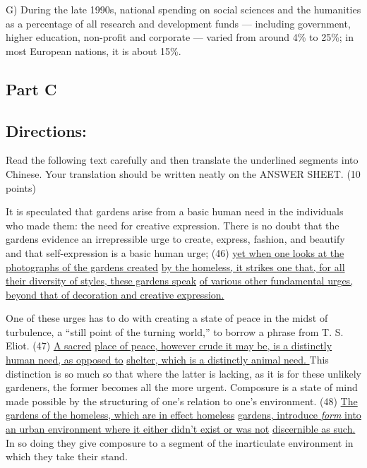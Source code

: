 \documentclass[UTF8,11pt]{ctexart}
\begin{document}
G) During the late 1990s, national spending on social sciences and the humanities as a percentage of all research and development funds — including government, higher education, non-profit and corporate — varied from around 4\% to 25\%; in most European nations, it is about 15\%.


\subsection*{\textbf{Part C}}


\subsection*{\textbf{Directions:}}


Read the following text carefully and then translate the underlined segments into Chinese. Your translation should be written neatly on the ANSWER SHEET. (10 points)


It is speculated that gardens arise from a basic human need in the individuals who made them: the need for creative expression. There is no doubt that the gardens evidence an irrepressible urge to create, express, fashion, and beautify and that self-expression is a basic human urge; (46) \uline{yet when one looks at the photographs of the gardens created} \uline{by the homeless, it strikes one that, for all their diversity of styles, these gardens speak} \uline{of various other fundamental urges, beyond that of decoration and creative expression.}


One of these urges has to do with creating a state of peace in the midst of turbulence, a “still point of the turning world,” to borrow a phrase from T. S. Eliot. (47) \uline{A sacred} \uline{place of peace, however crude it may be, is a distinctly human need, as opposed to} \uline{shelter, which is a distinctly animal need. }This distinction is so much so that where the latter is lacking, as it is for these unlikely gardeners, the former becomes all the more urgent. Composure is a state of mind made possible by the structuring of one’s relation to one’s environment. (48) \uline{The gardens of the homeless, which are in effect homeless} \uline{gardens, introduce }\textit{\uline{form}}\uline{ into an urban environment where it either didn’t exist or was not} \uline{discernible as such. }In so doing they give composure to a segment of the inarticulate environment in which they take their stand.
\end{document}
